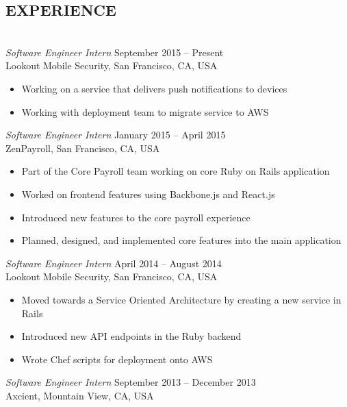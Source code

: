 \documentclass[a4paper, letterpaper]{res}
\begin{document}
\begin{resume}
\section{EXPERIENCE} 
				~\\[-2mm]
				{\sl Software Engineer Intern} \hspace*{3.15in}September 2015 -- Present \\
				Lookout Mobile Security, San Francisco, CA, USA
				\begin{itemize} \itemsep -2pt
				\item Working on a service that delivers push notifications to devices
				\item Working with deployment team to migrate service to AWS
				\end{itemize}
				{\sl Software Engineer Intern} \hspace*{3.1in}January 2015 -- April 2015 \\
				ZenPayroll, San Francisco, CA, USA
				\begin{itemize} \itemsep -2pt
				\item Part of the Core Payroll team working on core Ruby on Rails application
				\item Worked on frontend features using Backbone.js and React.js
				\item Introduced new features to the core payroll experience
				\item Planned, designed, and implemented core features into the main application
				\end{itemize}
				{\sl Software Engineer Intern} \hspace*{3.1in}April 2014 -- August 2014 \\
				Lookout Mobile Security, San Francisco, CA, USA
				\begin{itemize} \itemsep -2pt
				\item Moved towards a Service Oriented Architecture by creating a new service in Rails
				\item Introduced new API endpoints in the Ruby backend
				\item Wrote Chef scripts for deployment onto AWS
				\end{itemize}
				{\sl Software Engineer Intern} \hspace*{2.6in}September 2013 -- December 2013  \\
				Axcient, Mountain View, CA, USA
                 \begin{itemize}  \itemsep -2pt %

\end{itemize}
\end{resume}
\end{document}
